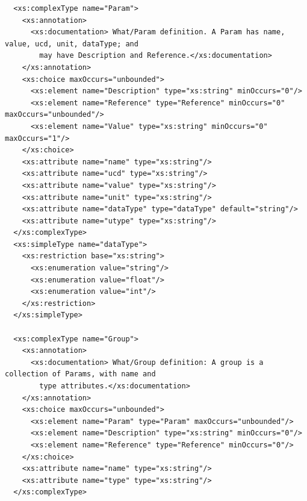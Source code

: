 \documentclass[11pt,a4paper]{ivoa}
\begin{document}
{\begin{verbatim}
  <xs:complexType name="Param">
    <xs:annotation>
      <xs:documentation> What/Param definition. A Param has name, value, ucd, unit, dataType; and
        may have Description and Reference.</xs:documentation>
    </xs:annotation>
    <xs:choice maxOccurs="unbounded">
      <xs:element name="Description" type="xs:string" minOccurs="0"/>
      <xs:element name="Reference" type="Reference" minOccurs="0" maxOccurs="unbounded"/>
      <xs:element name="Value" type="xs:string" minOccurs="0" maxOccurs="1"/>
    </xs:choice>
    <xs:attribute name="name" type="xs:string"/>
    <xs:attribute name="ucd" type="xs:string"/>
    <xs:attribute name="value" type="xs:string"/>
    <xs:attribute name="unit" type="xs:string"/>
    <xs:attribute name="dataType" type="dataType" default="string"/>
    <xs:attribute name="utype" type="xs:string"/>
  </xs:complexType>
  <xs:simpleType name="dataType">
    <xs:restriction base="xs:string">
      <xs:enumeration value="string"/>
      <xs:enumeration value="float"/>
      <xs:enumeration value="int"/>
    </xs:restriction>
  </xs:simpleType>

  <xs:complexType name="Group">
    <xs:annotation>
      <xs:documentation> What/Group definition: A group is a collection of Params, with name and
        type attributes.</xs:documentation>
    </xs:annotation>
    <xs:choice maxOccurs="unbounded">
      <xs:element name="Param" type="Param" maxOccurs="unbounded"/>
      <xs:element name="Description" type="xs:string" minOccurs="0"/>
      <xs:element name="Reference" type="Reference" minOccurs="0"/>
    </xs:choice>
    <xs:attribute name="name" type="xs:string"/>
    <xs:attribute name="type" type="xs:string"/>
  </xs:complexType>



\end{verbatim}}
\end{document}
